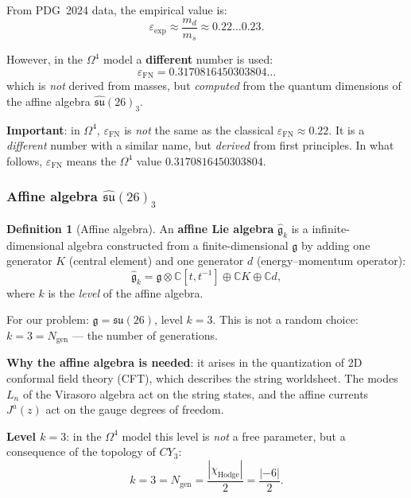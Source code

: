 \documentclass[11pt,a4paper]{article}
\newcommand{\CY}{\ensuremath{CY_3}}
\newcommand{\Om}{\ensuremath{\Omega^4}}
\newcommand{\Ngen}{\ensuremath{N_{\text{gen}}}}
\newcommand{\epsFN}{\ensuremath{\varepsilon_{\text{FN}}}}
\theoremstyle{definition}
\newtheorem{definition}[theorem]{Definition}
\begin{document}
From PDG~2024 data, the empirical value is:
\begin{equation}
    \varepsilon_{\text{exp}} \approx \frac{m_d}{m_s} \approx 0.22 \ldots 0.23.
\end{equation}

However, in the $\Om$ model a \textbf{different} number is used:
\begin{equation}
    \boxed{\; \epsFN = 0.3170816450303804\ldots \;}
\end{equation}
which is \emph{not} derived from masses, but \emph{computed} from
the quantum dimensions of the affine algebra $\hat{\mathfrak{su}}(26)_3$.

\medskip\noindent
\textbf{Important}: in $\Om$, $\epsFN$ is \emph{not} the same as
the classical $\varepsilon_{\text{FN}} \approx 0.22$. It is
a \emph{different} number with a similar name, but \emph{derived} from
first principles. In what follows, $\epsFN$ means the
$\Om$ value $0.3170816450303804$.

\subsubsection{Affine algebra \texorpdfstring{$\hat{\mathfrak{su}}(26)_3$}{su(26)\_3}}

\begin{definition}[Affine algebra]
\label{def:affine}
An \textbf{affine Lie algebra} $\hat{\mathfrak{g}}_k$ is a
infinite-dimensional algebra constructed from a finite-dimensional $\mathfrak{g}$
by adding one generator $K$ (central element) and
one generator $d$ (energy--momentum operator):
\begin{equation}
    \hat{\mathfrak{g}}_k = \mathfrak{g} \otimes \mathbb{C}[t, t^{-1}]
    \oplus \mathbb{C}K \oplus \mathbb{C}d,
\end{equation}
where $k$ is the \emph{level} of the affine algebra.
\end{definition}

For our problem: $\mathfrak{g} = \mathfrak{su}(26)$, level $k = 3$.
This is not a random choice: $k = 3 = \Ngen$ --- the number of generations.

\medskip\noindent
\textbf{Why the affine algebra is needed}: it arises in the
quantization of 2D conformal field theory (CFT), which describes the
string worldsheet. The modes $L_n$ of the Virasoro algebra act on
the string states, and the affine currents $J^a(z)$ act on the
gauge degrees of freedom.

\medskip\noindent
\textbf{Level $k = 3$}: in the $\Om$ model this level is
\emph{not} a free parameter, but a consequence of the topology of $\CY$:
\begin{equation}
    k = 3 = \Ngen = \frac{|\chi_{\text{Hodge}}|}{2} = \frac{|-6|}{2}.
\end{equation}
\end{document}
